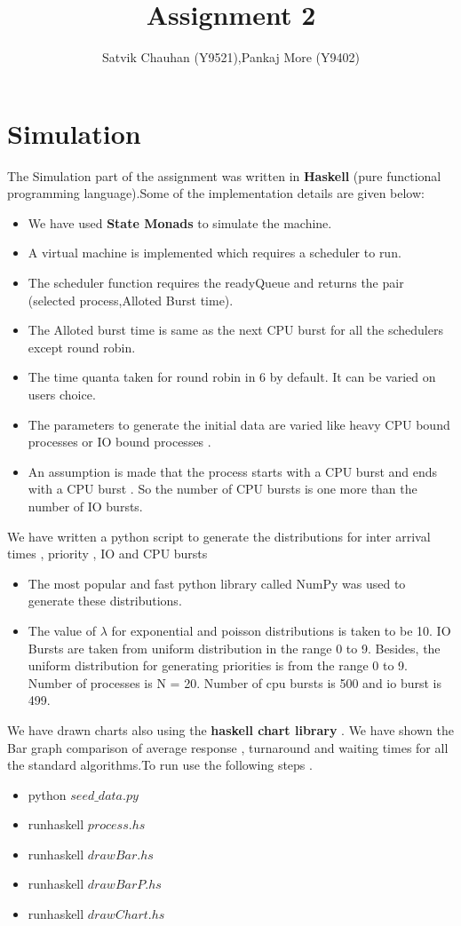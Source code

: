 \documentclass{article}
\title{Assignment 2}
\author{Satvik Chauhan (Y9521),Pankaj More (Y9402)}
\date{}
\begin{document}
\maketitle
\section*{Simulation}
The Simulation part of the assignment was written in \textbf{Haskell} (pure functional programming language).Some of the implementation details are given below:
\begin{itemize}
\item We have used \textbf{State Monads} to simulate the machine.
\item A virtual machine is implemented which requires a scheduler to run.
\item The scheduler function requires the readyQueue and returns the pair (selected process,Alloted Burst time).
\item The Alloted burst time is same as the next CPU burst for all the schedulers except round robin.
\item The time quanta taken for round robin in 6 by default. It can be varied on users choice.
\item The parameters to generate the initial data are varied like heavy CPU bound processes or IO bound processes .
\item An assumption is made that the process starts with a CPU burst and ends with a CPU burst . So the number of CPU bursts is one more than the number of IO bursts.
\end{itemize}
We have written a python script to generate the distributions for inter arrival times , priority , IO and CPU bursts
\begin{itemize}
\item The most popular and fast python library called NumPy was used to generate these  distributions.
\item The value of $\lambda$ for exponential and poisson distributions is taken to be 10. IO Bursts are taken from uniform distribution in the range 0 to 9. Besides, the uniform distribution for generating priorities is from the range 0 to 9. Number of processes is N = 20. Number of cpu bursts is 500 and io burst is 499. 
\end{itemize}
We have drawn charts also using the \textbf{haskell chart library} .
We have shown the Bar graph comparison of average response , turnaround and waiting times for all the standard algorithms.To run use the following steps .
\begin{itemize}
\item python $seed\_data.py$
\item runhaskell $process.hs$
\item runhaskell $drawBar.hs$
\item runhaskell $drawBarP.hs$
\item runhaskell $drawChart.hs$
\end{itemize}
\end{document}
